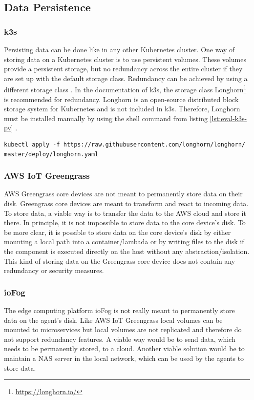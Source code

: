 \subsection*{Data Persistence}
\subsubsection*{k3s}
Persisting data can be done like in any other Kubernetes cluster. One way of storing data on a Kubernetes cluster is to use persistent volumes. These volumes provide a persistent storage, but no redundancy across the entire cluster if they are set up with the default storage class. Redundancy can be achieved by using a different storage class \cite{KubernetesDocsPersistentVolumes}. In the documentation of k3s, the storage class Longhorn\footnote{\url{https://longhorn.io/}} is recommended for redundancy. Longhorn is an open-source distributed block storage system for Kubernetes and is not included in k3s. Therefore, Longhorn must be installed manually by using the shell command from listing \ref{lst:eval-k3s-pv} \cite{k3sDocsPersistentVolumes}.

\begin{lstlisting}[caption={Installing Longhorn to k3s cluster \cite{k3sDocsPersistentVolumes}.},label={lst:eval-k3s-pv},captionpos=b]
kubectl apply -f https://raw.githubusercontent.com/longhorn/longhorn/ master/deploy/longhorn.yaml
\end{lstlisting}

\subsubsection*{AWS IoT Greengrass}
AWS Greengrass core devices are not meant to permanently store data on their disk. Greengrass core devices are meant to transform and react to incoming data. To store data, a viable way is to transfer the data to the AWS cloud and store it there. In principle, it is not impossible to store data to the core device's disk. To be more clear, it is possible to store data on the core device's disk by either mounting a local path into a container/lambada or by writing files to the disk if the component is executed directly on the host without any abstraction/isolation. This kind of storing data on the Greengrass core device does not contain any redundancy or security measures.

\subsubsection*{ioFog}
The edge computing platform ioFog is not really meant to permanently store data on the agent's disk. Like AWS IoT Greengrass local volumes can be mounted to microservices but local volumes are not replicated and therefore do not support redundancy features. A viable way would be to send data, which needs to be permanently stored, to a cloud. Another viable solution would be to maintain a NAS server in the local network, which can be used by the agents to store data. 

